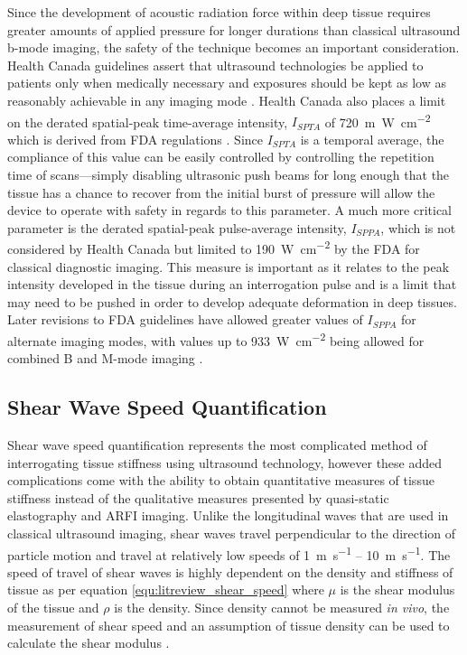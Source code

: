 			Since the development of acoustic radiation force within deep tissue requires greater amounts of applied pressure for longer durations than classical ultrasound b-mode imaging, the safety of the technique becomes an important consideration. Health Canada guidelines assert that ultrasound technologies be applied to patients only when medically necessary and exposures should be kept as low as reasonably achievable in any imaging mode \cite{HealthCanadaUltrasound}. Health Canada also places a limit on the derated spatial-peak time-average intensity, $I_{SPTA}$ of \SI{720}{\m\W\per\cm\squared} which is derived from FDA regulations \cite{FDAUltrasoundGuidelines}. Since $I_{SPTA}$ is a temporal average, the compliance of this value can be easily controlled by controlling the repetition time of scans---simply disabling ultrasonic push beams for long enough that the tissue has a chance to recover from the initial burst of pressure will allow the device to operate with safety in regards to this parameter. A much more critical parameter is the derated spatial-peak pulse-average intensity, $I_{SPPA}$, which is not considered by Health Canada but limited to \SI{190}{\W\per\cm\squared} by the FDA \cite{FDAUltrasoundGuidelines} for classical diagnostic imaging. This measure is important as it relates to the peak intensity developed in the tissue during an interrogation pulse and is a limit that may need to be pushed in order to develop adequate deformation in deep tissues. Later revisions to FDA guidelines have allowed greater values of $I_{SPPA}$ for alternate imaging modes, with values up to \SI{933}{\W\per\cm\squared} being allowed for combined B and M-mode imaging \cite{hoskins10}.

		\subsection{Shear Wave Speed Quantification}
			Shear wave speed quantification represents the most complicated method of interrogating tissue stiffness using ultrasound technology, however these added complications come with the ability to obtain quantitative measures of tissue stiffness instead of the qualitative measures presented by quasi-static elastography and ARFI imaging. Unlike the longitudinal waves that are used in classical ultrasound imaging, shear waves travel perpendicular to the direction of particle motion and travel at relatively low speeds of \SI{1}{\m\per\s} -- \SI{10}{\m\per\s}. The speed of travel of shear waves is highly dependent on the density and stiffness of tissue as per equation \ref{equ:litreview_shear_speed} where $\mu$ is the shear modulus of the tissue and $\rho$ is the density. Since density cannot be measured \emph{in vivo}, the measurement of shear speed and an assumption of tissue density can be used to calculate the shear modulus \cite{hoskins10}.

